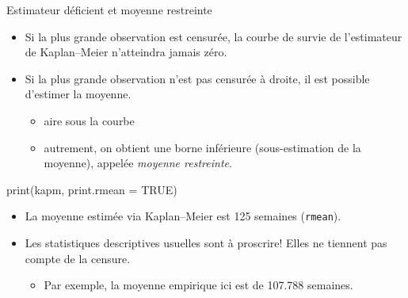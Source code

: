 \documentclass[
  ignorenonframetext,
]{beamer}
\newenvironment{Shaded}{\begin{snugshade}}{\end{snugshade}}
\newcommand{\AttributeTok}[1]{\textcolor[rgb]{0.40,0.45,0.13}{#1}}
\newcommand{\ConstantTok}[1]{\textcolor[rgb]{0.56,0.35,0.01}{#1}}
\newcommand{\FunctionTok}[1]{\textcolor[rgb]{0.28,0.35,0.67}{#1}}
\newcommand{\NormalTok}[1]{\textcolor[rgb]{0.00,0.23,0.31}{#1}}
\providecommand{\tightlist}{%
  \setlength{\itemsep}{0pt}\setlength{\parskip}{0pt}}\usepackage{longtable,booktabs,array}
\begin{document}
\begin{frame}[fragile]{Estimateur déficient et moyenne restreinte}
\protect\hypertarget{estimateur-duxe9ficient-et-moyenne-restreinte}{}
\begin{itemize}
\tightlist
\item
  Si la plus grande observation est censurée, la courbe de survie de
  l'estimateur de Kaplan--Meier n'atteindra jamais zéro.
\item
  Si la plus grande observation n'est pas censurée à droite, il est
  possible d'estimer la moyenne.

  \begin{itemize}
  \tightlist
  \item
    aire sous la courbe
  \item
    autrement, on obtient une borne inférieure (sous-estimation de la
    moyenne), appelée \emph{moyenne restreinte}.
  \end{itemize}
\end{itemize}

\begin{Shaded}
\begin{Highlighting}[numbers=left,,]
\FunctionTok{print}\NormalTok{(kapm, }\AttributeTok{print.rmean =} \ConstantTok{TRUE}\NormalTok{)}
\end{Highlighting}
\end{Shaded}

\begin{itemize}
\tightlist
\item
  La moyenne estimée via Kaplan--Meier est 125 semaines
  (\texttt{rmean}).\\
\item
  Les statistiques descriptives usuelles sont à proscrire! Elles ne
  tiennent pas compte de la censure.

  \begin{itemize}
  \tightlist
  \item
    Par exemple, la moyenne empirique ici est de 107.788 semaines.
  \end{itemize}
\end{itemize}
\end{frame}
\end{document}
